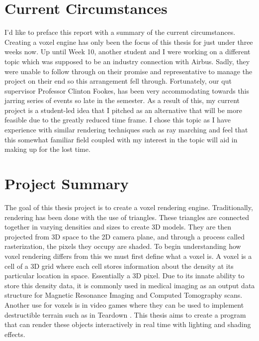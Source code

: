 \documentclass[titlepage]{article}
\begin{document}
\tableofcontents
\listoffigures
\printnoidxglossary[type=\acronymtype]
\newpage

\section{Current Circumstances}
I'd like to preface this report with a summary of the current circumstances. Creating a voxel engine has only been the focus of this thesis for just under three weeks now. Up until Week 10, another student and I were working on a different topic which was supposed to be an industry connection with Airbus. Sadly, they were unable to follow through on their promise and representative to manage the project on their end so this arrangement fell through. Fortunately, our \acrfull{qut} supervisor Professor Clinton Fookes, has been very accommodating towards this jarring series of events so late in the semester. As a result of this, my current project is a student-led idea that I pitched as an alternative that will be more feasible due to the greatly reduced time frame. I chose this topic as I have experience with similar rendering techniques such as ray marching and feel that this somewhat familiar field coupled with my interest in the topic will aid in making up for the lost time.

\section{Project Summary}
The goal of this thesis project is to create a voxel rendering engine. Traditionally, rendering has been done with the use of triangles. These triangles are connected together in varying densities and sizes to create 3D models. They are then projected from 3D space to the 2D camera plane, and through a process called rasterization, the pixels they occupy are shaded. To begin understanding how voxel rendering differs from this we must first define what a voxel is. A voxel is a cell of a 3D grid where each cell stores information about the density at its particular location in space. Essentially a 3D pixel. Due to its innate ability to store this density data, it is commonly used in medical imaging as an output data structure for Magnetic Resonance Imaging and Computed Tomography scans. Another use for voxels is in video games where they can be used to implement destructible terrain such as in Teardown \cite{teardown:steam}. This thesis aims to create a program that can render these objects interactively in real time with lighting and shading effects.
\end{document}
